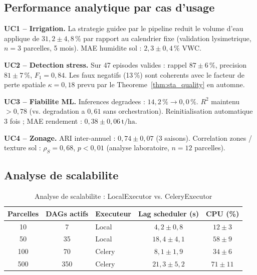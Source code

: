\documentclass[12pt,a4paper]{article}
\theoremstyle{plain}
\theoremstyle{definition}
\theoremstyle{remark}
\begin{document}
\subsection{Performance analytique par cas d'usage}

\textbf{UC1 -- Irrigation.}
La strategie guidee par le pipeline reduit le volume d'eau applique
de $31{,}2 \pm 4{,}8\,\%$ par rapport au calendrier fixe
(validation lysimetrique, $n=3$ parcelles, 5 mois).
MAE humidite sol : $2{,}3 \pm 0{,}4\,\%$ VWC.

\textbf{UC2 -- Detection stress.}
Sur 47 episodes valides : rappel $87 \pm 6\,\%$, precision
$81 \pm 7\,\%$, $F_1 = 0{,}84$.
Les faux negatifs (13\,\%) sont coherents avec le facteur de perte
spatiale $\kappa=0{,}18$ prevu par le
Theoreme~\ref{thm:sta_quality} en automne.

\textbf{UC3 -- Fiabilite ML.}
Inferences degradees : $14{,}2\,\% \to 0{,}0\,\%$.
$R^2$ maintenu $>0{,}78$ (vs. degradation a $0{,}61$ sans orchestration).
Reinitialisation automatique 3 fois ; MAE rendement :
$0{,}38 \pm 0{,}06\,\text{t/ha}$.

\textbf{UC4 -- Zonage.}
ARI inter-annuel : $0{,}74 \pm 0{,}07$ (3 saisons).
Correlation zones / texture sol : $\rho_S = 0{,}68$,
$p < 0{,}01$ (analyse laboratoire, $n=12$ parcelles).

\subsection{Analyse de scalabilite}

\begin{table}[H]
\caption{Analyse de scalabilite : LocalExecutor vs. CeleryExecutor}
\label{tab:scalability}
\centering\small
\renewcommand{\arraystretch}{1.35}
\begin{tabularx}{\linewidth}{ccXcc}
\toprule
\textbf{Parcelles} & \textbf{DAGs actifs} & \textbf{Executeur} &
\textbf{Lag scheduler (s)} & \textbf{CPU (\%)} \\
\midrule
\rowcolor{lightblue!30}
10  & 7   & Local  & $4{,}2 \pm 0{,}8$  & $12 \pm 3$ \\
50  & 35  & Local  & $18{,}4 \pm 4{,}1$ & $58 \pm 9$ \\
\rowcolor{lightblue!30}
100 & 70  & Celery & $8{,}1 \pm 1{,}9$  & $34 \pm 6$ \\
500 & 350 & Celery & $21{,}3 \pm 5{,}2$ & $71 \pm 11$ \\
\bottomrule
\end{tabularx}
\end{table}
\end{document}
